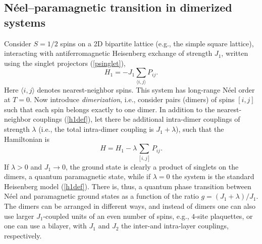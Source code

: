 \documentclass[range]{ar2e}
\begin{document}
\subsection{N\'eel--paramagnetic transition in dimerized systems}
\label{sec:dimermodels}

Consider $S=1/2$ spins on a 2D bipartite lattice (e.g., the simple square lattice), interacting with antiferromagnetic Heisenberg exchange of 
strength $J_1$, written using the singlet projectors (\ref{psinglet}),
\begin{equation}
H_1 = -J_1 \sum_{\langle i,j\rangle} P_{ij}.
\label{h1def}
\end{equation}
Here $\langle i,j\rangle$ denotes nearest-neighbor spins. This system has long-range N\'eel order at $T=0$. Now introduce {\it dimerization}, 
i.e., consider pairs (dimers) of spins $[i,j]$ such that each spin belongs exactly to one dimer. In addition to the nearest-neighbor couplings (\ref{h1def}),
let there be additional intra-dimer couplings of strength $\lambda$ (i.e., the total intra-dimer coupling is $J_1+\lambda$), such that the Hamiltonian is
\begin{equation}
H = H_1  -\lambda \sum_{[ i,j]} P_{ij} .
\end{equation}
If $\lambda>0$ and $J_1\to 0$, the ground state is clearly a product of singlets on the dimers, a quantum paramagnetic state, while if $\lambda=0$ 
the system is the standard Heisenberg model (\ref{h1def}). There is, thus, a quantum phase transition between N\'eel and paramagnetic ground states as a 
function of the ratio $g=(J_1+\lambda)/J_1$. The dimers can be arranged in different ways, and instead of dimers one can also use larger $J_1$-coupled 
units of an even number of spins, e.g., $4$-site plaquettes, or one can use a bilayer, with $J_1$ and $J_2$ the inter-and intra-layer couplings, respectively.
\end{document}
